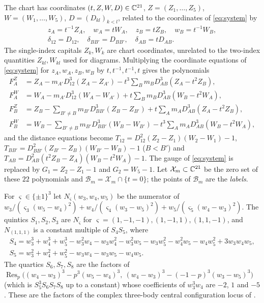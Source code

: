 The chart has coordinates $(t,Z,W,D)\in\mathbb{C}^{21}$, $Z=(Z_1,\dots,Z_5)$, $W=(W_1,\dots,W_5)$,
$D=(D_{kl})_{k<l}$, related to the coordinates of \eqref{eq:system} by
\begin{equation}\label{eq:d2-chart}
\begin{gathered}
  z_A=t^{-1}Z_A,\quad w_A=tW_A,\quad z_B=tZ_B,\quad w_B=t^{-1}W_B,\\
  \delta_{12}=D_{12},\quad \delta_{BB'}=D_{BB'},\quad \delta_{AB}=tD_{AB}.
\end{gathered}
\end{equation}
The single-index capitals $Z_k,W_k$ are chart coordinates, unrelated to the two-index quantities
$Z_{kl},W_{kl}$ used for diagrams.  Multiplying the coordinate equations of \eqref{eq:system} for
$z_A,w_A,z_B,w_B$ by $t,t^{-1},t^{-1},t$ gives the polynomials
\begin{equation}\label{eq:d2-rows}
\begin{aligned}
  F^Z_A&=Z_A-m_{A'}D_{12}^3(Z_A-Z_{A'})-t^3\textstyle\sum_Bm_BD_{AB}^3(Z_A-t^2Z_B),\\
  F^W_A&=W_A-m_{A'}D_{12}^3(W_A-W_{A'})+t\textstyle\sum_Bm_BD_{AB}^3(W_B-t^2W_A),\\
  F^Z_B&=Z_B-\textstyle\sum_{B'\ne B}m_{B'}D_{BB'}^3(Z_B-Z_{B'})
         +t\textstyle\sum_Am_AD_{AB}^3(Z_A-t^2Z_B),\\
  F^W_B&=W_B-\textstyle\sum_{B'\ne B}m_{B'}D_{BB'}^3(W_B-W_{B'})
         -t^3\textstyle\sum_Am_AD_{AB}^3(W_B-t^2W_A),
\end{aligned}
\end{equation}
and the distance equations become $T_{12}=D_{12}^2(Z_2-Z_1)(W_2-W_1)-1$,
$T_{BB'}=D_{BB'}^2(Z_{B'}-Z_B)(W_{B'}-W_B)-1$ ($B<B'$) and
$T_{AB}=D_{AB}^2(t^2Z_B-Z_A)(W_B-t^2W_A)-1$.  The gauge of \eqref{eq:system} is replaced by
$G_1=Z_2-Z_1-1$ and $G_2=W_5-1$.
Let $\mathcal X_m\subset\mathbb{C}^{21}$ be the zero set of these $22$ polynomials and
$\mathcal B_m=\mathcal X_m\cap\{t=0\}$; the points of $\mathcal B_m$ are the \emph{labels}.

\begin{definition}\label{def:d2-shapes}
For $\varsigma\in\{\pm1\}^3$ let $N_\varsigma(w_3,w_4,w_5)$ be the numerator of
$w_3/(\varsigma_3(w_5-w_4)^2)+w_4/(\varsigma_4(w_3-w_5)^2)+w_5/(\varsigma_5(w_4-w_3)^2)$.  The
quintics $S_1,S_2,S_3$ are $N_\varsigma$ for $\varsigma=(1,-1,-1),(1,-1,1),(1,1,-1)$, and
$N_{(1,1,1)}$ is a constant multiple of $S_4S_5$, where
\begin{gather*}
  S_4=w_3^3+w_4^3+w_5^3-w_3^2w_4-w_3w_4^2-w_3^2w_5-w_3w_5^2-w_4^2w_5-w_4w_5^2+3w_3w_4w_5,\\
  S_5=w_3^2+w_4^2+w_5^2-w_3w_4-w_3w_5-w_4w_5 .
\end{gather*}
The quartics $S_6,S_7,S_8$ are the factors of
$\operatorname{Res}_p\bigl((w_4-w_3)^3-p^3(w_5-w_4)^3,\ (w_4-w_3)^3-(-1-p)^3(w_3-w_5)^3\bigr)$
(which is $S_5^3S_6S_7S_8$ up to a constant) whose coefficients of $w_3^3w_4$ are $-2$, $1$ and
$-5$.  These are the factors of the complex three-body central configuration locus of
\cite[Appendix, pp.~585--586]{AK}.
\end{definition}

